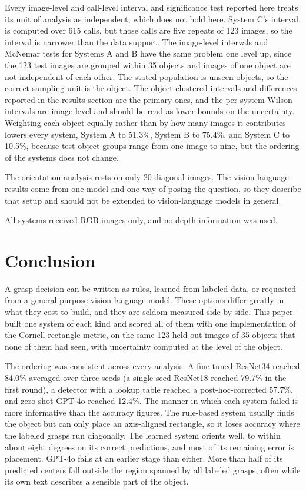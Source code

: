 \documentclass[12pt,letterpaper]{article}
\begin{document}
Every image-level and call-level interval and significance test reported
here treats its unit of analysis as independent, which does not hold
here. System C's interval is computed over 615 calls, but those calls
are five repeats of 123 images, so the interval is narrower than the
data support. The image-level intervals and McNemar tests for Systems A
and B have the same problem one level up, since the 123 test images are
grouped within 35 objects and images of one object are not independent
of each other. The stated population is unseen objects, so the correct
sampling unit is the object. The object-clustered intervals and
differences reported in the results section are the primary ones, and
the per-system Wilson intervals are image-level and should be read as
lower bounds on the uncertainty. Weighting each object equally rather
than by how many images it contributes lowers every system, System A to
51.3\%, System B to 75.4\%, and System C to 10.5\%, because test object
groups range from one image to nine, but the ordering of the systems
does not change.

The orientation analysis rests on only 20 diagonal images. The
vision-language results come from one model and one way of posing the
question, so they describe that setup and should not be extended to
vision-language models in general.

All systems received RGB images only, and no depth information was used.

\section{Conclusion}

A grasp decision can be written as rules, learned from labeled data, or
requested from a general-purpose vision-language model. These options
differ greatly in what they cost to build, and they are seldom measured
side by side. This paper built one system of each kind and scored all of
them with one implementation of the Cornell rectangle metric, on the
same 123 held-out images of 35 objects that none of them had seen, with
uncertainty computed at the level of the object.

The ordering was consistent across every analysis. A fine-tuned ResNet34
reached 84.0\% averaged over three seeds (a single-seed ResNet18 reached
79.7\% in the first round), a detector with a lookup table reached a
post-hoc-corrected 57.7\%, and zero-shot GPT-4o reached 12.4\%. The
manner in which each system failed is more informative than the accuracy
figures. The rule-based system usually finds the object but can only
place an axis-aligned rectangle, so it loses accuracy where the labeled
grasps run diagonally. The learned system orients well, to within about
eight degrees on its correct predictions, and most of its remaining
error is placement. GPT-4o fails at an earlier stage than either. More
than half of its predicted centers fall outside the region spanned by
all labeled grasps, often while its own text describes a sensible part
of the object.
\end{document}
